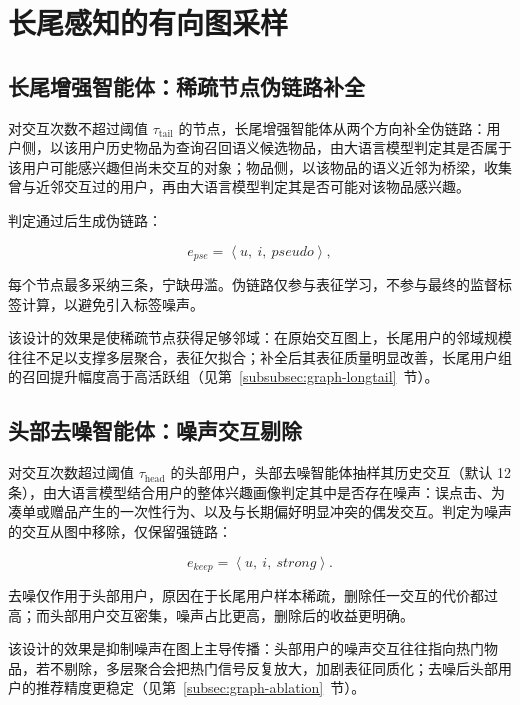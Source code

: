 \section{长尾感知的有向图采样}
\label{sec:graph-sampling}

\subsection{长尾增强智能体：稀疏节点伪链路补全}
\label{subsec:pseudo-link}

对交互次数不超过阈值 $\tau_{\text{tail}}$ 的节点，长尾增强智能体从两个方向补全伪链路：用户侧，以该用户历史物品为查询召回语义候选物品，由大语言模型判定其是否属于该用户可能感兴趣但尚未交互的对象；物品侧，以该物品的语义近邻为桥梁，收集曾与近邻交互过的用户，再由大语言模型判定其是否可能对该物品感兴趣。

判定通过后生成伪链路：

\begin{equation}
  e_{pse} = \left\langle u,\ i,\ \mathit{pseudo} \right\rangle ,
  \label{eq:pseudo-tuple}
\end{equation}

每个节点最多采纳三条，宁缺毋滥。伪链路仅参与表征学习，不参与最终的监督标签计算，以避免引入标签噪声。

该设计的效果是使稀疏节点获得足够邻域：在原始交互图上，长尾用户的邻域规模往往不足以支撑多层聚合，表征欠拟合；补全后其表征质量明显改善，长尾用户组的召回提升幅度高于高活跃组（见第~\ref{subsubsec:graph-longtail}~节）。

\subsection{头部去噪智能体：噪声交互剔除}
\label{subsec:strong-link}

对交互次数超过阈值 $\tau_{\text{head}}$ 的头部用户，头部去噪智能体抽样其历史交互（默认 12 条），由大语言模型结合用户的整体兴趣画像判定其中是否存在噪声：误点击、为凑单或赠品产生的一次性行为、以及与长期偏好明显冲突的偶发交互。判定为噪声的交互从图中移除，仅保留强链路：

\begin{equation}
  e_{keep} = \left\langle u,\ i,\ \mathit{strong} \right\rangle .
  \label{eq:keep-tuple}
\end{equation}

去噪仅作用于头部用户，原因在于长尾用户样本稀疏，删除任一交互的代价都过高；而头部用户交互密集，噪声占比更高，删除后的收益更明确。

该设计的效果是抑制噪声在图上主导传播：头部用户的噪声交互往往指向热门物品，若不剔除，多层聚合会把热门信号反复放大，加剧表征同质化；去噪后头部用户的推荐精度更稳定（见第~\ref{subsec:graph-ablation}~节）。

